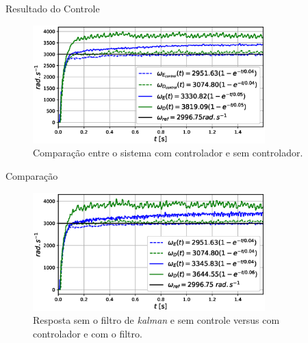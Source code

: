 \begin{frame}{Resultado do Controle}

    \begin{figure}
        \centering
        \includegraphics[width=0.8\textwidth]{figuras/resultados/exp04/controlador_vs_sem_controlador100.eps}
        \caption{Comparação entre o sistema com controlador e sem controlador.}
    \end{figure}
    
\end{frame}

\begin{frame}{Comparação}
    \begin{figure}
        \centering
        \includegraphics[width=0.8\textwidth]{figuras/resultados/exp04/antes_vs_depois100.eps}
        \caption{Resposta sem o filtro de \emph{kalman} e sem controle versus com controlador e com o filtro.}
    \end{figure}
\end{frame}